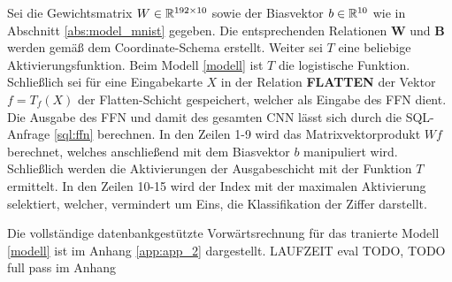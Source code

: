 Sei die Gewichtsmatrix $W \in \mathbb{R}^{192 \times 10}$ sowie der Biasvektor $b \in \mathbb{R}^{10}$ wie in Abschnitt \ref{abs:model_mnist} gegeben. Die entsprechenden Relationen \textbf{W} und \textbf{B} werden gemäß dem Coordinate-Schema erstellt. Weiter sei $T$ eine beliebige Aktivierungsfunktion. Beim Modell \ref{modell} ist $T$ die logistische Funktion. Schließlich sei für eine Eingabekarte $X$ in der Relation \textbf{FLATTEN} der Vektor $f=T_f(X)$ der Flatten-Schicht gespeichert, welcher als Eingabe des FFN dient. Die Ausgabe des FFN und damit des gesamten CNN lässt sich durch die SQL-Anfrage \ref{sql:ffn} berechnen. In den Zeilen 1-9 wird das Matrixvektorprodukt $Wf$ berechnet, welches anschließend mit dem Biasvektor $b$ manipuliert wird. Schließlich werden die Aktivierungen der Ausgabeschicht mit der Funktion $T$ ermittelt. In den Zeilen 10-15 wird der Index mit der maximalen Aktivierung selektiert, welcher, vermindert um Eins, die Klassifikation der Ziffer darstellt.



Die vollständige datenbankgestützte Vorwärtsrechnung für das tranierte Modell \ref{modell} ist im Anhang \ref{app:app_2} dargestellt. LAUFZEIT eval TODO, TODO full pass im Anhang